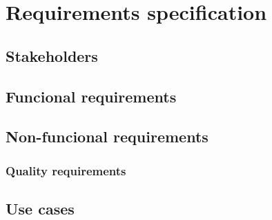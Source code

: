 \chapter{Requirements specification}
\label{Requirements}

\section{Stakeholders}

\section{Funcional requirements}

\section{Non-funcional requirements}

\subsection{Quality requirements}


\section{Use cases}

